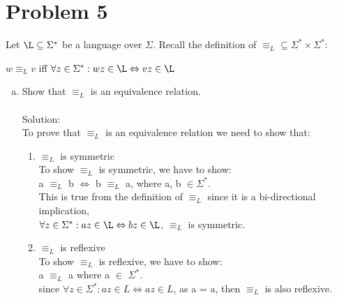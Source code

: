 \documentclass{article}
\newcommand*\moveToRight[1]{\hspace*{0em plus 1fill}\makebox{(#1)}}
\begin{document}
\section{Problem 5}
Let $\L \subseteq \Sigma^*$ be a language over $\Sigma$. Recall the definition of $\equiv_L \subseteq \Sigma^* \times \Sigma^*:$
\begin{center}
    $w \equiv_L v$  iff  $\forall z \in \Sigma^* : wz \in \L \Leftrightarrow vz \in \L$
\end{center}
\begin{enumerate}[(a)]
    \item Show that $\equiv_L$ is an equivalence relation. \moveToRight{6 marks}\\\\Solution:\\
    To prove that $\equiv_L$ is an equivalence relation we need to show that:
    
    \begin{enumerate} [1.]
        \item $\equiv_L$ is symmetric\\
        To show $\equiv_L$ is symmetric, we have to show:\\
        a $\equiv_L$ b $\iff$ b $\equiv_L$ a, where a, b $\in \Sigma^*$.
        \\
        This is true from the definition of $\equiv_L$ since it is a bi-directional implication,\\$\forall z \in \Sigma^* : az \in \L \Leftrightarrow bz \in \L$, $\equiv_L$ is symmetric.
        
        \item $\equiv_L$ is reflexive\\
        To show $\equiv_L$ is reflexive, we have to show:\\
        a $\equiv_L$ a where a $\in$ $\Sigma^*$.\\
        since $\forall z \in \Sigma^* : az \in L \Leftrightarrow az \in L$, as a = a, then $\equiv_L$ is also reflexive.
        

\end{enumerate}
\end{enumerate}
\end{document}

